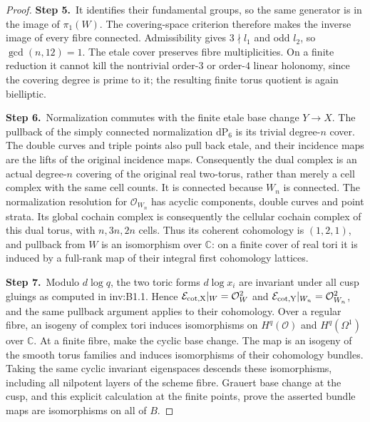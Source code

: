 \begin{proof}
\par\smallskip\noindent\textbf{Step 5.}\ It identifies their fundamental groups, so the same generator is in the image of $\pi_1(W)$.
The covering-space criterion therefore makes the inverse image of
every fibre connected. Admissibility gives $3\nmid l_1$ and odd $l_2$,
so $\gcd(n,12)=1$. The etale cover preserves fibre multiplicities.
On a finite reduction it cannot kill the nontrivial order-$3$ or
order-$4$ linear holonomy, since the covering degree is prime to it;
the resulting finite torus quotient is again bielliptic.

\par\smallskip\noindent\textbf{Step 6.}\ Normalization commutes with the finite etale base change $Y\to X$.
The pullback of the simply connected normalization $\mathrm{dP}_6$
is its trivial degree-$n$ cover. The double curves and triple points
also pull back etale, and their incidence maps are the lifts of the
original incidence maps. Consequently the dual complex is an actual
degree-$n$ covering of the original real two-torus, rather than merely
a cell complex with the same cell counts. It is connected because
$W_n$ is connected. The normalization resolution for $\mathcal O_{W_n}$
has acyclic components, double curves and point strata. Its global
cochain complex is consequently the cellular cochain complex of this
dual torus, with $n,3n,2n$ cells. Thus its coherent cohomology is
$(1,2,1)$, and pullback from $W$ is an isomorphism over $\mathbb C$:
on a finite cover of real tori it is induced by a full-rank map of
their integral first cohomology lattices.

\par\smallskip\noindent\textbf{Step 7.}\ Modulo $d\log q$, the two toric forms $d\log x_i$ are invariant
under all cusp gluings as computed in inv:B1.1. Hence
$\mathcal E_{\rm cot,X}|_W=\mathcal O_W^2$ and $\mathcal E_{\rm cot,Y}|_{W_n}=\mathcal O_{W_n}^2$,
and the same pullback argument applies to their cohomology.
Over a regular fibre, an isogeny of complex tori induces isomorphisms
on $H^q(\mathcal O)$ and $H^q(\Omega^1)$ over $\mathbb C$.
At a finite fibre, make the cyclic base change. The map is an isogeny
of the smooth torus families and induces isomorphisms of their
cohomology bundles. Taking the same cyclic invariant eigenspaces
descends these isomorphisms, including all nilpotent layers of the
scheme fibre. Grauert base change at the cusp, and this explicit
calculation at the finite points, prove the asserted bundle maps are
isomorphisms on all of $B$.
\end{proof}

